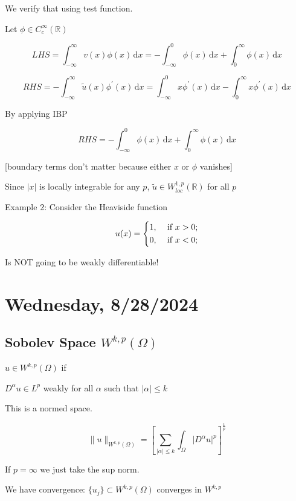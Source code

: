 \documentclass{article}
\theoremstyle{definition}
\begin{document}
We verify that using test function.

Let \(\phi \in C_c^{\infty} (\mathbb{R})\) 

\[
    LHS = \int_{-\infty}^{\infty} v(x)\phi(x) \,\mathrm{d}x = - \int_{-\infty}^{0} \phi(x) \,\mathrm{d}x + \int_{0}^{\infty} \phi(x) \,\mathrm{d}x 
\]

\[
    RHS = - \int_{-\infty}^{\infty} \tilde{u}(x)\phi^{\prime} (x) \,\mathrm{d}x = \int_{-\infty}^{0} x \phi^{\prime} (x) \,\mathrm{d}x - \int_{0}^{\infty} x \phi^{\prime} (x) \,\mathrm{d}x 
\]

By applying IBP

\[
    RHS = - \int_{-\infty}^{0} \phi(x) \,\mathrm{d}x + \int_{0}^{\infty} \phi(x) \,\mathrm{d}x 
\]

[boundary terms don't matter because either \(x\) or \(\phi \) vanishes]

Since \(\vert x \vert\) is locally integrable for any \(p\), \(\tilde{u}\in W_{loc}^{1,p}(\mathbb{R})\) for all \(p\) 

Example 2: Consider the Heaviside function

\[
    u(x) = \begin{dcases}
        1, &\text{ if } x > 0 ;\\
        0, &\text{ if } x < 0 ;
    \end{dcases}
\]

Is NOT going to be weakly differentiable!


\section*{Wednesday, 8/28/2024}

\subsection*{Sobolev Space \(W^{k,p}(\Omega)\) }

\(u \in W^{k,p}(\Omega)\) if


\(D^\alpha u \in L^p\) weakly for all \(\alpha \) such that \(\vert \alpha  \vert \leq k\) 

This is a normed space.

\[
    \lVert u \rVert _{W^{k,p}(\Omega)} = \left[ \sum_{\vert \alpha  \vert \leq k} \int_\Omega \vert D^\alpha u \vert ^p \right] ^{\frac{1}{p}}
\]

If \(p = \infty\) we just take the sup norm.

We have convergence: \(\{ u_j \} \subset W^{k,p}(\Omega)\) converges in \(W^{k,p}\)
\end{document}

